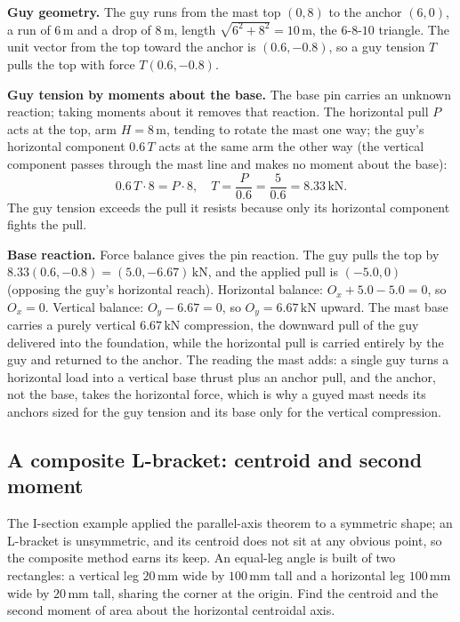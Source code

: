 \textbf{Guy geometry.} The guy runs from the mast top $(0, 8)$ to the anchor
$(6, 0)$, a run of $6\,\si{\meter}$ and a drop of $8\,\si{\meter}$, length
$\sqrt{6^2 + 8^2} = 10\,\si{\meter}$, the $6$-$8$-$10$ triangle. The unit
vector from the top toward the anchor is $(0.6, -0.8)$, so a guy tension $T$
pulls the top with force $T(0.6, -0.8)$.

\textbf{Guy tension by moments about the base.} The base pin carries an
unknown reaction; taking moments about it removes that reaction. The
horizontal pull $P$ acts at the top, arm $H = 8\,\si{\meter}$, tending to
rotate the mast one way; the guy's horizontal component $0.6\,T$ acts at the
same arm the other way (the vertical component passes through the mast line
and makes no moment about the base):
\[
0.6\,T\cdot 8 = P\cdot 8, \quad T = \frac{P}{0.6} = \frac{5}{0.6}
= 8.33\,\text{kN}.
\]
The guy tension exceeds the pull it resists because only its horizontal
component fights the pull.

\textbf{Base reaction.} Force balance gives the pin reaction. The guy pulls
the top by $8.33(0.6, -0.8) = (5.0, -6.67)\,\text{kN}$, and the applied pull
is $({-5.0}, 0)$ (opposing the guy's horizontal reach). Horizontal balance:
$O_x + 5.0 - 5.0 = 0$, so $O_x = 0$. Vertical balance:
$O_y - 6.67 = 0$, so $O_y = 6.67\,\text{kN}$ upward. The mast base carries a
purely vertical $6.67\,\text{kN}$ compression, the downward pull of the guy
delivered into the foundation, while the horizontal pull is carried entirely
by the guy and returned to the anchor. The reading the mast adds: a single
guy turns a horizontal load into a vertical base thrust plus an anchor pull,
and the anchor, not the base, takes the horizontal force, which is why a
guyed mast needs its anchors sized for the guy tension and its base only for
the vertical compression.

\subsection{A composite L-bracket: centroid and second moment}

The I-section example applied the parallel-axis theorem to a symmetric
shape; an L-bracket is unsymmetric, and its centroid does not sit at any
obvious point, so the composite method earns its keep. An equal-leg angle is
built of two rectangles: a vertical leg $20\,\si{\milli\meter}$ wide by
$100\,\si{\milli\meter}$ tall and a horizontal leg $100\,\si{\milli\meter}$
wide by $20\,\si{\milli\meter}$ tall, sharing the corner at the origin. Find
the centroid and the second moment of area about the horizontal centroidal
axis.

